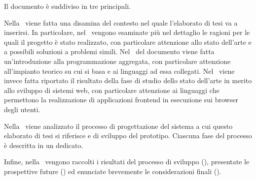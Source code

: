 \bigskip

Il documento è suddiviso in tre  principali.

Nella~ viene fatta una disamina del contesto nel quale l'elaborato di tesi va a inserirsi.
In particolare, nel~ vengono esaminate più nel dettaglio le ragioni per le quali il progetto è stato realizzato,
con particolare attenzione allo stato dell'arte e a possibili soluzioni a problemi simili.
Nel~ del documento viene fatta un'introduzione alla programmazione aggregata, con particolare attenzione all'impianto teorico su cui si basa e ai linguaggi ad essa collegati.
Nel~ viene invece fatta riportato il risultato della fase di studio dello stato dell'arte in merito allo sviluppo di sistemi web,
con particolare attenzione ai linguaggi che permettono la realizzazione di applicazioni frontend in esecuzione sui browser degli utenti.

Nella~ viene analizzato il processo di progettazione del sistema a cui questo elaborato di tesi si riferisce e di sviluppo del prototipo.
Ciascuna fase del processo è descritta in un  dedicato.

Infine, nella~ vengono raccolti i risultati del processo di sviluppo (), presentate le prospettive future () ed enunciate brevemente le considerazioni finali ().
